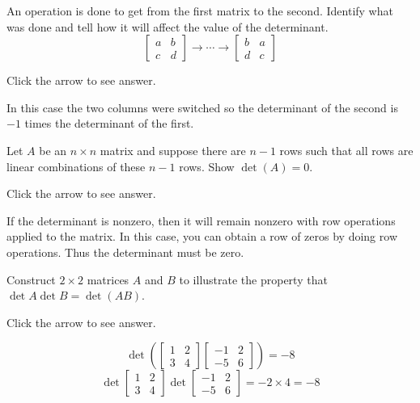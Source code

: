 \documentclass{ximera}
\begin{document}
\begin{problem}\label{prb:7.13} An operation is done to get from the first matrix to the second.
Identify what was done and tell how it will affect the value of the
determinant.
\begin{equation*}
\left[
\begin{array}{cc}
a & b \\
c & d
\end{array}
\right] \rightarrow \cdots \rightarrow \left[
\begin{array}{cc}
b & a \\
d & c
\end{array}
\right]
\end{equation*}

Click the arrow to see answer.
\begin{expandable}
In this case the two columns were switched so the determinant of the second
is $-1$ times the determinant of the first.
\end{expandable}
\end{problem}

\begin{problem}\label{prb:7.14} Let $A$ be an $n\times n$ matrix and suppose there are $n-1$ rows
such that all rows are linear combinations of these $n-1$
rows. Show $\det \left( A\right) =0$.

Click the arrow to see answer.
\begin{expandable}
If the determinant is nonzero, then it will remain nonzero with row operations applied to the matrix.
In this case, you can obtain a row of zeros by doing row
operations. Thus the determinant must be zero.
\end{expandable}
\end{problem}

\begin{problem}\label{prb:7.16} Construct $2\times 2$ matrices $A$ and $B$ to illustrate the property that
$\det A \det B = \det (AB)$.

Click the arrow to see answer.
\begin{expandable}
\[
\det
\left( \left[
\begin{array}{cc}
1 & 2 \\
3 & 4
\end{array}
\right] \left[
\begin{array}{rr}
-1 & 2 \\
-5 & 6
\end{array}
\right] \right) = -8
\]
\[
\det \left[
\begin{array}{cc}
1 & 2 \\
3 & 4
\end{array}
\right] \det \left[
\begin{array}{rr}
-1 & 2 \\
-5 & 6
\end{array}
\right] = -2 \times 4 = -8
\]
\end{expandable}
\end{problem}
\end{document}
